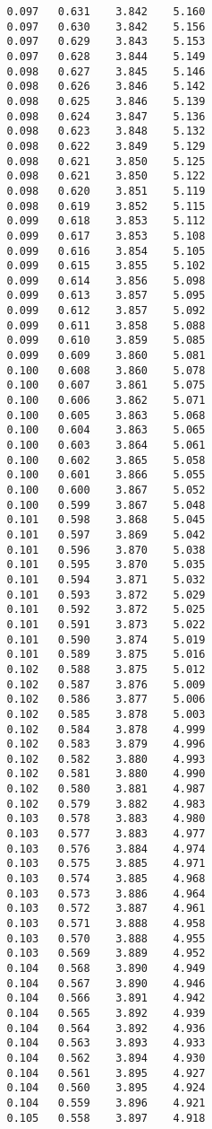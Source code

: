 \begin{verbatim}
   0.097   0.631    3.842    5.160
   0.097   0.630    3.842    5.156
   0.097   0.629    3.843    5.153
   0.097   0.628    3.844    5.149
   0.098   0.627    3.845    5.146
   0.098   0.626    3.846    5.142
   0.098   0.625    3.846    5.139
   0.098   0.624    3.847    5.136
   0.098   0.623    3.848    5.132
   0.098   0.622    3.849    5.129
   0.098   0.621    3.850    5.125
   0.098   0.621    3.850    5.122
   0.098   0.620    3.851    5.119
   0.098   0.619    3.852    5.115
   0.099   0.618    3.853    5.112
   0.099   0.617    3.853    5.108
   0.099   0.616    3.854    5.105
   0.099   0.615    3.855    5.102
   0.099   0.614    3.856    5.098
   0.099   0.613    3.857    5.095
   0.099   0.612    3.857    5.092
   0.099   0.611    3.858    5.088
   0.099   0.610    3.859    5.085
   0.099   0.609    3.860    5.081
   0.100   0.608    3.860    5.078
   0.100   0.607    3.861    5.075
   0.100   0.606    3.862    5.071
   0.100   0.605    3.863    5.068
   0.100   0.604    3.863    5.065
   0.100   0.603    3.864    5.061
   0.100   0.602    3.865    5.058
   0.100   0.601    3.866    5.055
   0.100   0.600    3.867    5.052
   0.100   0.599    3.867    5.048
   0.101   0.598    3.868    5.045
   0.101   0.597    3.869    5.042
   0.101   0.596    3.870    5.038
   0.101   0.595    3.870    5.035
   0.101   0.594    3.871    5.032
   0.101   0.593    3.872    5.029
   0.101   0.592    3.872    5.025
   0.101   0.591    3.873    5.022
   0.101   0.590    3.874    5.019
   0.101   0.589    3.875    5.016
   0.102   0.588    3.875    5.012
   0.102   0.587    3.876    5.009
   0.102   0.586    3.877    5.006
   0.102   0.585    3.878    5.003
   0.102   0.584    3.878    4.999
   0.102   0.583    3.879    4.996
   0.102   0.582    3.880    4.993
   0.102   0.581    3.880    4.990
   0.102   0.580    3.881    4.987
   0.102   0.579    3.882    4.983
   0.103   0.578    3.883    4.980
   0.103   0.577    3.883    4.977
   0.103   0.576    3.884    4.974
   0.103   0.575    3.885    4.971
   0.103   0.574    3.885    4.968
   0.103   0.573    3.886    4.964
   0.103   0.572    3.887    4.961
   0.103   0.571    3.888    4.958
   0.103   0.570    3.888    4.955
   0.103   0.569    3.889    4.952
   0.104   0.568    3.890    4.949
   0.104   0.567    3.890    4.946
   0.104   0.566    3.891    4.942
   0.104   0.565    3.892    4.939
   0.104   0.564    3.892    4.936
   0.104   0.563    3.893    4.933
   0.104   0.562    3.894    4.930
   0.104   0.561    3.895    4.927
   0.104   0.560    3.895    4.924
   0.104   0.559    3.896    4.921
   0.105   0.558    3.897    4.918

\end{verbatim}
